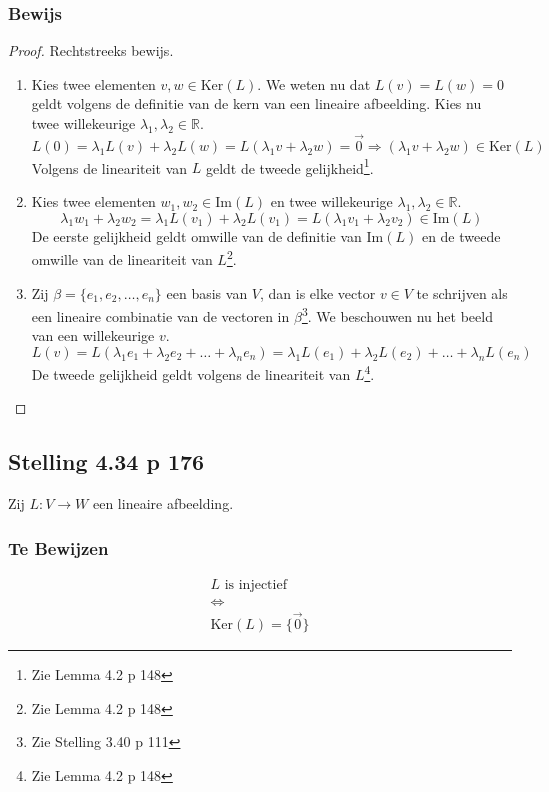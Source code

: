 \documentclass[lineaire_algebra_oplossingen.tex]{subfiles}
\begin{document}
\subsubsection*{Bewijs}
\begin{proof}
Rechtstreeks bewijs.
\begin{enumerate}
\item Kies twee elementen $v,w \in \text{Ker}(L)$. We weten nu dat $L(v)=L(w)=0$ geldt volgens de definitie van de kern van een lineaire afbeelding. Kies nu twee willekeurige $\lambda_1,\lambda_2 \in \mathbb{R}$.
\[
 L(0) = \lambda_1L(v)+\lambda_2L(w) = L(\lambda_1v+\lambda_2w) = \vec{0}
 \Rightarrow  (\lambda_1v+\lambda_2w) \in \text{Ker}(L)
\]
Volgens de lineariteit van $L$ geldt de tweede gelijkheid\footnote{Zie Lemma 4.2 p 148}.

\item Kies twee elementen $w_1,w_2 \in \text{Im}(L)$ en twee willekeurige $\lambda_1,\lambda_2 \in \mathbb{R}$.
\[
\lambda_1w_1+\lambda_2w_2 = \lambda_1L(v_1) + \lambda_2L(v_1) = L(\lambda_1v_1+\lambda_2v_2) \in \text{Im}(L)
\]
De eerste gelijkheid geldt omwille van de definitie van $\text{Im}(L)$ en de tweede omwille van de lineariteit van $L$\footnote{Zie Lemma 4.2 p 148}.

\item Zij $\beta = \{e_1,e_2,\ldots,e_n\}$ een basis van $V$, dan is elke vector $v\in V$ te schrijven als een lineaire combinatie van de vectoren in $\beta$\footnote{Zie Stelling 3.40 p 111}. We beschouwen nu het beeld van een willekeurige $v$.
\[
L(v) = L(\lambda_1e_1+\lambda_2e_2 + \ldots + \lambda_ne_n) = \lambda_1L(e_1)+\lambda_2L(e_2) + \ldots + \lambda_nL(e_n)
\] 
De tweede gelijkheid geldt volgens de lineariteit van $L$\footnote{Zie Lemma 4.2 p 148}.
\end{enumerate}
\end{proof}


\subsection{Stelling 4.34 p 176}
\label{4.34}
Zij $L:V\rightarrow W$ een lineaire afbeelding.

\subsubsection*{Te Bewijzen}
\begin{gather*}
L \text{ is injectief}\\
\Leftrightarrow\\
\text{Ker}(L) = \{\vec{0}\}
\end{gather*}
\end{document}
